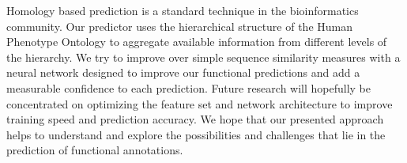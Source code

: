 Homology based prediction is a standard technique in the bioinformatics community. Our predictor uses the hierarchical structure of the Human Phenotype Ontology to aggregate available information from different levels of the hierarchy. We try to improve over simple sequence similarity measures with a neural network designed to improve our functional predictions and add a measurable confidence to each prediction. Future research will hopefully be concentrated on optimizing the feature set and network architecture to improve training speed and prediction accuracy. We hope that our presented approach helps to understand and explore the possibilities and challenges that lie in the prediction of functional annotations.